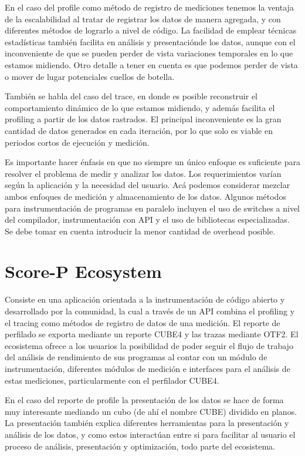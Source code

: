 \documentclass[conference]{IEEEtran}
\begin{document}
En el caso del profile como método de registro de mediciones tenemos la ventaja de la escalabilidad al tratar de registrar los datos de manera agregada, y con diferentes métodos de lograrlo a nivel de código. La facilidad de emplear técnicas estadísticas también facilita en análisis y presentaciónde los datos, aunque con el inconveniente de que se pueden perder de vista variaciones temporales en lo que estamos midiendo. Otro detalle a tener en cuenta es que podemos perder de vista o mover  de lugar potenciales cuellos de botella.

También se habla del caso del trace, en donde es posible reconstruir el comportamiento dinámico de lo que estamos midiendo, y además facilita el profiling a partir de los datos rastrados. El principal inconveniente es la gran cantidad de datos generados en cada iteración, por lo que solo es viable en periodos cortos de ejecución y medición.

Es importante hacer énfasis en que no siempre un único enfoque es suficiente para resolver el problema de medir y analizar los datos. Los requerimientos varían según la aplicación y la necesidad del usuario. Acá podemos considerar mezclar ambos enfoques de medición y almacenamiento de los datos.
Algunos métodos para instrumentación de programas en paralelo incluyen el uso de switches a nivel del compilador, instrumentación con API y el uso de bibliotecas especializadas. Se debe tomar en cuenta introducir la menor cantidad de overhead posible.

\section{Score-P Ecosystem}
Consiste en una aplicación orientada a la instrumentación de código abierto y desarrollado por la comunidad, la cual a través de un API combina el profiling y el tracing como métodos de registro de datos de una medición. El reporte de perfilado se exporta mediante un reporte CUBE4 y las trazas mediante OTF2. El ecosistema ofrece a los usuarios la posibilidad de poder seguir el flujo de trabajo del análisis de rendimiento de sus programas al contar con un módulo de instrumentación, diferentes módulos de medición e interfaces para el análisis de estas mediciones, particularmente con el perfilador CUBE4.

En el caso del reporte de profile la presentación de los datos se hace de forma muy interesante mediando un cubo (de ahí el nombre CUBE) dividido en planos. La presentación también explica diferentes herramientas para la presentación y análisis de los datos, y como estos interactúan entre si para facilitar al usuario el proceso de análisis, presentación y optimización, todo parte del ecosistema.
\end{document}
